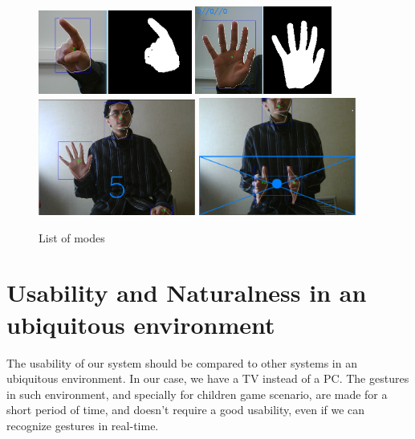 \documentclass{llncs}
\begin{document}
\begin{figure}[!htb]
\centering
  \includegraphics[width=0.45\textwidth]{./pics/point.png}
  \includegraphics[width=0.4\textwidth]{./pics/simplify.png}
  \includegraphics[width=0.46\textwidth]{./pics/fingers.png}
  \includegraphics[width=0.46\textwidth]{./pics/move.png}
  \caption{List of modes}
\end{figure}


\section{Usability and Naturalness in an ubiquitous environment}

The usability of our system should be compared to other systems in an ubiquitous
environment. In our case, we have a TV instead of a PC.
The gestures in such environment, and specially for children game scenario,
are made for a short period of time, and doesn't require a good usability,
even if we can recognize gestures in real-time.
\end{document}
